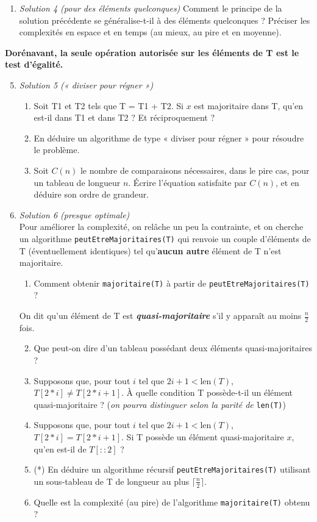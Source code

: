 \documentclass{article}
\begin{document}
{\begin{enumerate}
    \item \textit{Solution 4 (pour des éléments quelconques)} Comment le principe de la solution précédente se généralise-t-il à des éléments quelconques ? Préciser les complexités en espace et en temps (au mieux, au pire et en moyenne).
\end{enumerate}

\textbf{Dorénavant, la seule opération autorisée sur les éléments de T est le test d'égalité.}

\begin{enumerate}
    \setcounter{enumi}{4}
    \item \textit{Solution 5 (« diviser pour régner »)}
    \begin{enumerate}
        \item Soit T1 et T2 tels que T = T1 + T2. Si $x$ est majoritaire dans T, qu'en est-il dans T1 et dans T2 ? Et réciproquement ?
        \item En déduire un algorithme de type « diviser pour régner » pour résoudre le problème.
        \item Soit $C(n)$ le nombre de comparaisons nécessaires, dans le pire cas, pour un tableau de longueur $n$. Écrire l'équation satisfaite par $C(n)$, et en déduire son ordre de grandeur.
    \end{enumerate}

    \item \textit{Solution 6 (presque optimale)} \\
    Pour améliorer la complexité, on relâche un peu la contrainte, et on cherche un algorithme \texttt{peutEtreMajoritaires(T)} qui renvoie un couple d'éléments de T (éventuellement identiques) tel qu'\textbf{aucun autre} élément de T n'est majoritaire.
    \begin{enumerate}
        \item Comment obtenir \texttt{majoritaire(T)} à partir de \texttt{peutEtreMajoritaires(T)} ?
    \end{enumerate}
    On dit qu'un élément de T est \textit{\textbf{quasi-majoritaire}} s'il y apparaît au moins $\frac{n}{2}$ fois.
    \begin{enumerate}
        \setcounter{enumii}{1}
        \item Que peut-on dire d'un tableau possédant deux éléments quasi-majoritaires ?
        \item Supposons que, pour tout $i$ tel que $2i + 1 < \text{len}(T)$, $T[2*i] \neq T[2*i+1]$. À quelle condition T possède-t-il un élément quasi-majoritaire ? (\textit{on pourra distinguer selon la parité de} \texttt{len(T)})
        \item Supposons que, pour tout $i$ tel que $2i + 1 < \text{len}(T)$, $T[2*i] = T[2*i+1]$. Si T possède un élément quasi-majoritaire $x$, qu'en est-il de $T[::2]$ ?
        \item (*) En déduire un algorithme récursif \texttt{peutEtreMajoritaires(T)} utilisant un sous-tableau de T de longueur au plus $\lceil \frac{n}{2} \rceil$.
        \item Quelle est la complexité (au pire) de l'algorithme \texttt{majoritaire(T)} obtenu ?
    \end{enumerate}
\end{enumerate}}
\end{document}
